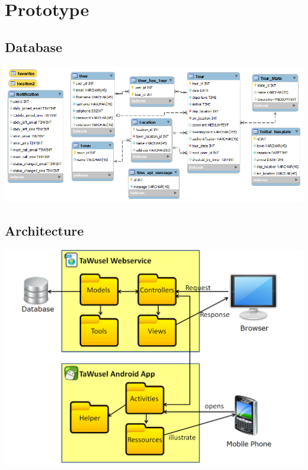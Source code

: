 \chapter{Prototype}\label{wo6}

\section{Database}\label{wo6_1}

\begin{center}
	\includegraphics[width=17cm]{img/Datenbank_Model}
\end{center}

\section{Architecture}\label{wo6_2}

\begin{center}
	\includegraphics[width=17cm]{img/Architekturdiagramm}
\end{center}


